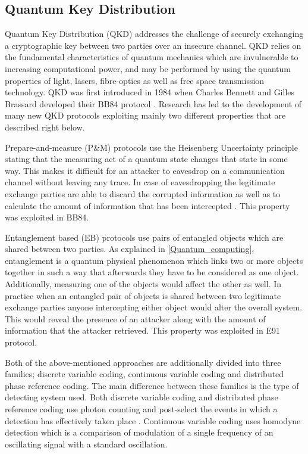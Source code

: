 \documentclass[conference, letterpaper]{IEEEtran}
\begin{document}
\subsection{Quantum Key Distribution}
Quantum Key Distribution (QKD) addresses the challenge of securely exchanging a cryptographic key between two parties over an insecure channel. QKD relies on the fundamental characteristics of quantum mechanics which are invulnerable to increasing computational power, and may be performed by using the quantum properties of light, lasers, fibre-optics as well as free space transmission technology. QKD was first introduced in 1984 when Charles Bennett and Gilles Brassard developed their BB84 protocol \cite{BennettCharlesandBrassard1984,Bennett1992}. Research has led to the development of many new QKD protocols exploiting mainly two different properties that are described right below.

Prepare-and-measure (P\&M) protocols use the Heisenberg Uncertainty principle \cite{panarella1987heisenberg} stating that the measuring act of a quantum state changes that state in some way. This makes it difficult for an attacker to eavesdrop on a communication channel without leaving any trace. In case of eavesdropping the legitimate exchange parties are able to discard the corrupted information as well as to calculate the amount of information that has been intercepted \cite{singh2012quantum}. This property was exploited in BB84.

Entanglement based (EB) protocols use pairs of entangled objects which are shared between two parties. As explained in \ref{Quantum_computing}, entanglement is a quantum physical phenomenon which links two or more objects together in such a way that afterwards they have to be considered as one object. Additionally, measuring one of the objects would affect the other as well. In practice when an entangled pair of objects is shared between two legitimate exchange parties anyone intercepting either object would alter the overall system. This would reveal the presence of an attacker along with the amount of information that the attacker retrieved. This property was exploited in E91 \cite{ekert1991quantum} protocol. 

Both of the above-mentioned approaches are additionally divided into three families; discrete variable coding, continuous variable coding and distributed phase reference coding. The main difference between these families is the type of detecting system used. Both discrete variable coding and distributed phase reference coding use photon counting and post-select the events in which a detection has effectively taken place \cite{scarani2009security}. Continuous variable coding uses homodyne detection \cite{scarani2009security} which is a comparison of modulation of a single frequency of an oscillating signal with a standard oscillation.
\end{document}
